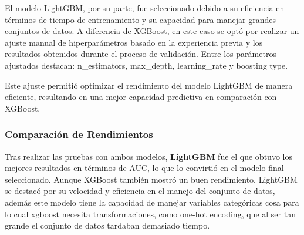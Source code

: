 \documentclass[a4paper,11pt]{article}
\begin{document}
El modelo LightGBM, por su parte, fue seleccionado debido a su eficiencia en términos de tiempo de entrenamiento y su capacidad para manejar grandes conjuntos de datos. A diferencia de XGBoost, en este caso se optó por realizar un ajuste manual de hiperparámetros basado en la experiencia previa y los resultados obtenidos durante el proceso de validación. Entre los parámetros ajustados destacan: n_estimators, max_depth, learning_rate y boosting type.

Este ajuste permitió optimizar el rendimiento del modelo LightGBM de manera eficiente, resultando en una mejor capacidad predictiva en comparación con XGBoost.

\subsubsection{Comparación de Rendimientos}

Tras realizar las pruebas con ambos modelos, \textbf{LightGBM} fue el que obtuvo los mejores resultados en términos de AUC, lo que lo convirtió en el modelo final seleccionado. Aunque XGBoost también mostró un buen rendimiento, LightGBM se destacó por su velocidad y eficiencia en el manejo del conjunto de datos, además este modelo tiene la capacidad de manejar variables categóricas cosa para lo cual xgboost necesita transformaciones, como one-hot encoding, que al ser tan grande el conjunto de datos tardaban demasiado tiempo. 


    
\end{document}
